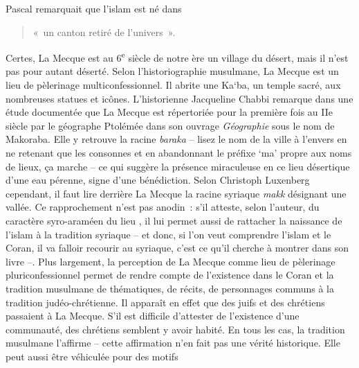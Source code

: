 Pascal remarquait que l'islam est né dans 
\begin{quote}
    «~un canton retiré de
l'univers~».
\end{quote} 
Certes, La Mecque est au 6\textsuperscript{e} siècle de
notre ère un village du désert, mais il n'est pas pour autant
déserté. Selon l'historiographie musulmane, La Mecque est un lieu de
pèlerinage multiconfessionnel. Il abrite une Ka`ba, un temple sacré, aux
nombreuses statues et icônes. L'historienne Jacqueline Chabbi remarque
dans une étude documentée que La Mecque
est répertoriée pour la première fois au IIe siècle par le géographe
Ptolémée dans son ouvrage \emph{Géographie} sous le nom de
Makoraba. Elle y
retrouve la racine \emph{baraka} -- lisez le nom de la ville à l'envers
en ne retenant que les consonnes et en abandonnant le préfixe `ma'
propre aux noms de lieux, ça marche -- ce qui suggère la présence
miraculeuse en ce lieu désertique d'une eau pérenne, signe d'une
bénédiction. Selon Christoph Luxenberg cependant, il faut lire derrière
La Mecque la racine syriaque \emph{makk} désignant une vallée. Ce
rapprochement n'est pas anodin~: s'il atteste, selon l'auteur, du
caractère syro-araméen du lieu {,} il lui permet aussi de
rattacher la naissance de l'islam à la tradition syriaque -- et donc, si l'on veut comprendre l'islam et
le Coran, il va falloir recourir au syriaque, c'est ce qu'il cherche à
montrer dans son livre --.
Plus largement, la perception de La Mecque comme lieu de pèlerinage
pluriconfessionnel permet de rendre compte de l'existence dans le Coran
et la tradition musulmane de thématiques, de récits, de personnages
communs à la tradition judéo-chrétienne. Il apparaît en effet que des
juifs et des chrétiens passaient à La Mecque. S'il est difficile
d'attester de l'existence d'une communauté, des chrétiens semblent y
avoir habité. En tous les cas, la tradition musulmane
l'affirme -- cette affirmation n'en fait pas une
vérité historique. Elle peut aussi être véhiculée pour des motifs
